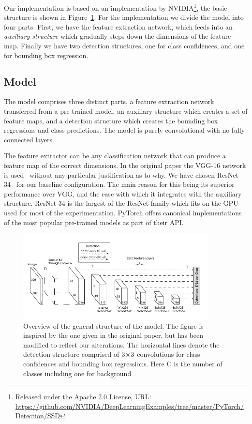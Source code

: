 Our implementation is based on an implementation by NVIDIA\footnote{Released under the Apache 2.0 License, \href{https://github.com/NVIDIA/DeepLearningExamples/tree/master/PyTorch/Detection/SSD}{URL:\\ } \url{https://github.com/NVIDIA/DeepLearningExamples/tree/master/PyTorch/Detection/SSD}}, the basic structure is shown in Figure~\ref{fig:model}.
For the implementation we divide the model into four parts.
First, we have the feature extraction network, which feeds into an \textit{auxiliary structure} which gradually steps down the dimensions of the feature map.
Finally we have two detection structures, one for class confidences, and one for bounding box regression.

\subsection{Model}
The model comprises three distinct parts, a feature extraction network transferred from a pre-trained model, an auxiliary structure which creates a set of feature maps, and a detection structure which creates the bounding box regressions and class predictions.
The model is purely convolutional with no fully connected layers.

The feature extractor can be any classification network that can produce a feature map of the correct dimensions.
In the original paper the VGG-16 network is used~\parencite{simonyan2015deep} without any particular justification as to why.
We have chosen ResNet-34~\parencite{he2015deep} for our baseline configuration.
The main reason for this being its superior performance over VGG, and the ease with which it integrates with the auxiliary structure. ResNet-34 is the largest of the ResNet family which fits on the GPU used for most of the experimentation.
PyTorch offers canonical implementations of the most popular pre-trained models as part of their API\@.

\begin{figure}[htb]
  \centering
  \includegraphics[width=0.9\textwidth]{figs/model.pdf}
  \caption[Model architecture overview]{Overview of the general structure of the model. The figure is inspired by the one given in the original paper, but has been modified to reflect our alterations.
The horizontal lines denote the detection structure comprised of \(3\!\times \! 3\) convolutions for class confidences and bounding box regressions.
Here \textsf{C} is the number of classes including one for background}\label{fig:model}
\end{figure}

